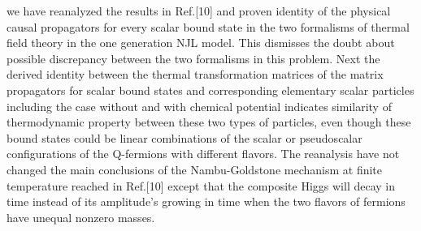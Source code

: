\documentclass[twocolumn,prd,showpacs,a4paper]{revtex4}
\begin{document}
we have reanalyzed the results in Ref.[10] and proven identity of the physical causal 
propagators for every scalar bound state in the two formalisms of thermal field theory 
in the one generation NJL model. This dismisses the doubt about possible discrepancy 
between the two formalisms in this problem. Next the derived identity between the 
thermal transformation matrices of the matrix propagators for scalar bound states 
and corresponding elementary scalar particles including the case without and with 
chemical potential indicates similarity of thermodynamic property between these two 
types of particles, even though these bound states could be linear combinations of 
the scalar or pseudoscalar configurations of the Q-fermions with different flavors. 
The reanalysis have not changed the main conclusions of the Nambu-Goldstone mechanism 
at finite temperature reached in Ref.[10] except that the composite Higgs \coordHE{} 
will decay in time instead of its amplitude's growing in time when the two flavors 
of fermions have unequal nonzero masses. 
 
\end{document}
